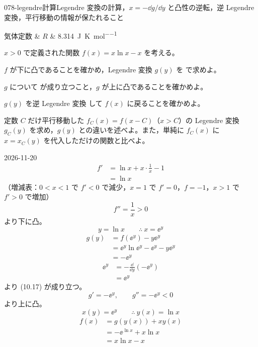 \documentclass[uplatex,dvipdfmx,a4paper,11pt]{jsarticle}
\begin{document}
\begin{mondai}{078-legendre}{計算}{Legendre 変換の計算，$x = -\dd g/\dd y$ と凸性の逆転，逆 Legendre 変換，平行移動の情報が保たれること}
\begin{teisuu}
  気体定数 & $R$ & \qty{8.314}{\joule\per\kelvin\per\mole}\\
\end{teisuu}
$x > 0$ で定義された関数 $f(x) = x\ln x - x$ を考える。
  \begin{shoumon}
    \item $f$ が下に凸であることを確かめ，Legendre 変換 $g(y)$ を  で求めよ。
    \item $g$ について  が成り立つこと，$g$ が上に凸であることを確かめよ。
    \item $g(y)$ を逆 Legendre 変換  して $f(x)$ に戻ることを確かめよ。
    \item 定数 $C$ だけ平行移動した $f_{C}(x) = f(x - C)$（$x > C$）の Legendre 変換 $g_{C}(y)$ を求め，$g(y)$ との違いを述べよ。また，単純に $f_{C}(x)$ に $x = x_{C}(y)$ を代入しただけの関数と比べよ。
  \end{shoumon}
\begin{kotaeutsushi}{2026-11-20}
\begin{align*}
f'&=\ln x+x\cdot\frac{1}{x}-1\\
&=\ln x
\end{align*}
（増減表：$0<x<1$ で $f'<0$ で減少，$x=1$ で $f'=0$，$f=-1$，$x>1$ で $f'>0$ で増加）
\[ f''=\frac{1}{x}>0 \]
より下に凸。
\[ y=\ln x \qquad \therefore\ x=\ee^{y} \]
\begin{align*}
g(y)&=f(\ee^{y})-y\ee^{y}\\
&=\ee^{y}\ln\ee^{y}-\ee^{y}-y\ee^{y}\\
&=-\ee^{y}
\end{align*}
\begin{align*}
\ee^{y}&=-\frac{\dd}{\dd y}(-\ee^{y})\\
&=\ee^{y}
\end{align*}
より (10.17) が成り立つ。
\[ g'=-\ee^{y}, \qquad g''=-\ee^{y}<0 \]
より上に凸。
\[ x(y)=\ee^{y} \qquad \therefore\ y(x)=\ln x \]
\begin{align*}
f(x)&=g(y(x))+xy(x)\\
&=-\ee^{\ln x}+x\ln x\\
&=x\ln x-x
\end{align*}

\end{kotaeutsushi}
\end{mondai}
\end{document}

